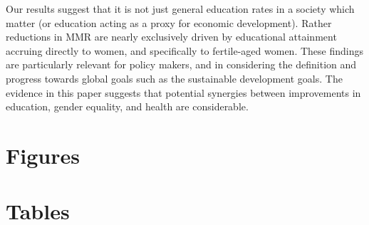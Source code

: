 \documentclass{article}[12pt,subeqn]
\newcommand{\MMRfolder}{"."}
\begin{document}
\begin{spacing}{1.4}
Our results suggest that it is not just general education rates in a society
which matter (or education acting as a proxy for economic development). Rather
reductions in MMR are nearly exclusively driven by educational attainment
accruing directly to women, and specifically to fertile-aged women.  These
findings are particularly relevant for policy makers, and in considering the
definition and progress towards global goals such as the sustainable
development goals.  The evidence in this paper suggests that potential synergies
between improvements in education, gender equality, and health are considerable.



\newpage
\section*{Figures}


\section*{Tables}





\newpage

\newpage


\appendix


\end{spacing}
\end{document}
